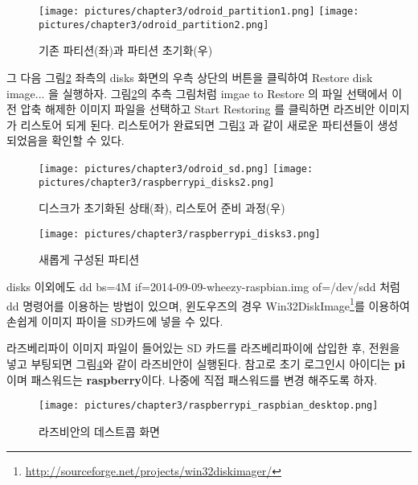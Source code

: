 \begin{figure}[h]
\centering
\texttt{[image: pictures/chapter3/odroid\_partition1.png]}
\texttt{[image: pictures/chapter3/odroid\_partition2.png]}
\caption{기존 파티션(좌)과 파티션 초기화(우)}
\label{fig:partition_init1}
\end{figure}

\noindent
그 다음 그림\ref{fig:raspbian_partition} 좌측의 disks 화면의 우측 상단의 버튼을 클릭하여 Restore disk image... 을 실행하자. 그림\ref{fig:raspbian_partition}의 추측 그림처럼 imgae to Restore 의 파일 선택에서 이전 압축 해제한 이미지 파일을 선택하고 Start Restoring 를 클릭하면 라즈비안 이미지가 리스토어 되게 된다. 리스토어가 완료되면 그림\ref{fig:raspbian_partition_new} 과 같이 새로운 파티션들이 생성 되었음을 확인할 수 있다.

\vspace{\baselineskip}
\begin{figure}[h]
\centering
\texttt{[image: pictures/chapter3/odroid\_sd.png]}
\texttt{[image: pictures/chapter3/raspberrypi\_disks2.png]}
\caption{디스크가 초기화된 상태(좌), 리스토어 준비 과정(우)}
\label{fig:raspbian_partition}
\end{figure}

\begin{figure}[h]
\centering\texttt{[image: pictures/chapter3/raspberrypi\_disks3.png]}
\caption{새롭게 구성된 파티션}
\label{fig:raspbian_partition_new}
\end{figure}

\newpage

\begin{exercise}
disks 이외에도 dd bs=4M if=2014-09-09-wheezy-raspbian.img of=/dev/sdd 처럼 dd 명령어를 이용하는 방법이 있으며, 윈도우즈의 경우 Win32DiskImage\footnote{\url{http://sourceforge.net/projects/win32diskimager/}}를 이용하여 손쉽게 이미지 파이을 SD카드에 넣을 수 있다.
\end{exercise}

\vspace{\baselineskip}
라즈베리파이 이미지 파일이 들어있는 SD 카드를 라즈베리파이에 삽입한 후, 전원을 넣고 부팅되면 그림\ref{fig:raspberrypi_raspbian_on}와 같이 라즈비안이 실행된다. 참고로 초기 로그인시 아이디는 \textbf{pi} 이며 패스워드는 \textbf{raspberry}이다. 나중에 직접 패스워드를 변경 해주도록 하자.

\begin{figure}[h]
\centering\texttt{[image: pictures/chapter3/raspberrypi\_raspbian\_desktop.png]}
\caption{라즈비안의 데스트콥 화면}
\label{fig:raspberrypi_raspbian_on}
\end{figure}

